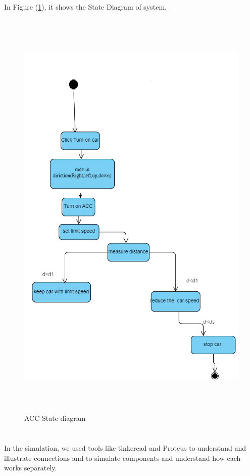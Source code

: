 \documentclass[12pt,a4paper]{report}
\begin{document}
\subsection{\fontsize{12}{12}\selectfont{ACC State Diagram:}}
In Figure (\ref{fig:State}), it shows the State Diagram of  system.
\begin{figure}[H]
    \centering
    \graphicspath{ {./images/} }
    \includegraphics[width=1\textwidth,height=20.5cm]{state diagram (1).png} 
    \caption{ ACC State diagram}
    \label{fig:State}
\end{figure}



\section{\fontsize{12}{12}\selectfont{Simulation and/or Experimental Test}}
In the simulation, we used tools like  tinkercad and Proteus to understand and illustrate connections and to simulate components and understand how each works separately.
\end{document}
